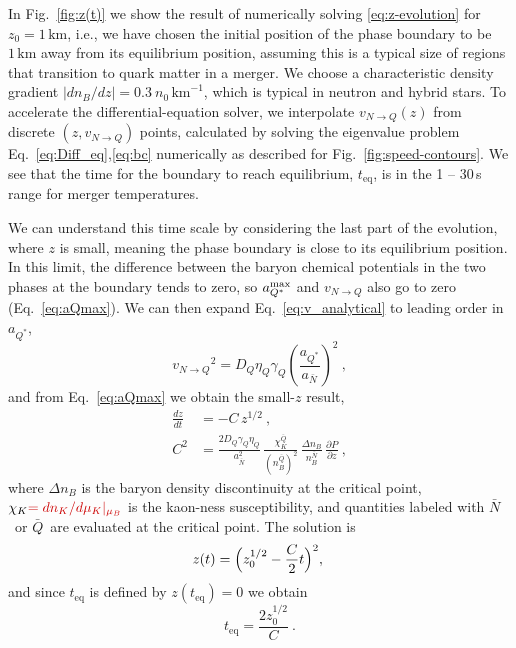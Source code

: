 \documentclass[10pt,superscriptaddress,
amsmath,aps,prl,twocolumn,nofootinbib]{revtex4-1}
\newcommand{\mga}[1]{{\color[rgb]{0.8,0,0}#1}}
\newcommand{\mgacom}[1]{\textsf{\color[rgb]{0.6,0,0}[\textsuperscript{MGA} #1]}}
\newcommand{\JS}[1]{{\color{violet}#1}}
\newcommand{\De}{\Delta}
\newcommand{\km}{\text{km}}
\newcommand{\aQstar}{\ensuremath{a_{Q^*}}}
\newcommand{\vb}{\ensuremath{v_{N\to Q}}}
\newcommand{\Nbar}{{\ensuremath{\bar N}}}
\newcommand{\Qbar}{{\ensuremath{\bar Q}}}
\newcommand{\tfinal}{\ensuremath{t_\text{eq}}}
\begin{document}
In Fig.~\ref{fig:z(t)} we show the result of numerically solving
\eqref{eq:z-evolution} for $z_0=1\,\km$, i.e., we have chosen the initial position of the phase boundary to be $1\,\km$ away from its equilibrium position, \mga{assuming this is a typical size of regions that transition to quark matter in a merger.}
We choose a characteristic \JS{density gradient $|dn_B/dz| = 0.3\ n_0\,\mathrm{km}^{-1}$}, which is typical in neutron and hybrid stars.  
To accelerate the differential-equation solver, we interpolate $\vb(z)$ from discrete $(z,\vb)$ points,
\mga{calculated by solving the eigenvalue problem Eq.~\eqref{eq:Diff_eq},\eqref{eq:bc} numerically as described for Fig.~\ref{fig:speed-contours}.} 
We see that the time for the boundary to reach equilibrium, \tfinal, is in the 1 -- \JS{3}0\,s range for merger temperatures. 

We can understand this time scale by considering the last part of the evolution, where $z$ is small, meaning the phase boundary is close to its equilibrium position.
In this limit, the difference between the baryon chemical potentials in the two phases at the boundary tends to zero, so $\aQstar^{\rm max}$ and $\vb$ also go to zero (Eq.~\eqref{eq:aQmax}). 
We can then expand Eq.~\eqref{eq:v_analytical} to leading order in $\aQstar$, 
\begin{equation}
    \vb^2 = D_Q\eta_Q\gamma_Q\left(\frac{\aQstar}{a_\Nbar}\right)^2\ ,
    \label{eq:vb-a}
\end{equation}
and from Eq.~\eqref{eq:aQmax} we obtain the small-$z$ result,
\begin{align}
 \frac{dz}{dt} &= -C\,z^{1/2} \ , \\
 C^2 &= 
\frac{2D_Q\gamma_Q\eta_Q}{a_\Nbar^2} \,
\frac{\chi_K^\Qbar}{(n_B^\Qbar)^2}\,
\frac{\De n_B}{n_{B}^\Nbar} \,
\frac{\partial P}{\partial z} \ ,
 \label{eq:v_asymptotic}
\end{align}
where $\De n_B$ is the baryon density discontinuity at the critical point, $\chi_K\mga{=dn_K/d\mu_K|_{\mu_B}}$ is the kaon-ness susceptibility, and quantities labeled with \Nbar\ or \Qbar\ are evaluated at the critical point. The solution is
\begin{equation}
    z(t) = \Bigl(z_0^{1/2} - \frac{C}{2}t \Bigr)^2 ,\;\label{eq:z(t)_analytical}
\end{equation}
and since $\tfinal$ is defined by $z(\tfinal)=0$ we obtain
\begin{equation}
\tfinal = \dfrac{2 z_0^{1/2}}{C} \ .
\end{equation}
\end{document}

